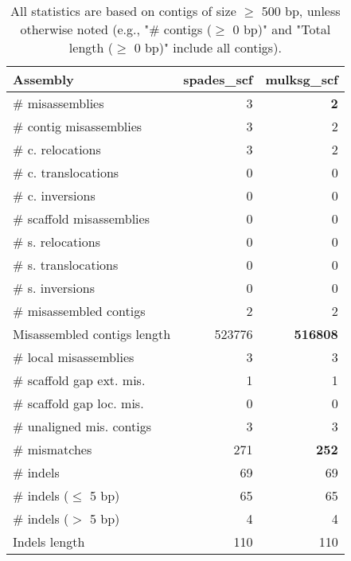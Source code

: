 \documentclass[12pt,a4paper]{article}
\begin{document}
\begin{table}[ht]
\begin{center}
\caption{All statistics are based on contigs of size $\geq$ 500 bp, unless otherwise noted (e.g., "\# contigs ($\geq$ 0 bp)" and "Total length ($\geq$ 0 bp)" include all contigs).}
\begin{tabular}{|l*{2}{|r}|}
\hline
Assembly & spades\_scf & mulksg\_scf \\ \hline
\# misassemblies & 3 & {\bf 2} \\ \hline
\hspace{2mm}\# contig misassemblies & 3 & 2 \\ \hline
\hspace{5mm}\# c. relocations & 3 & 2 \\ \hline
\hspace{5mm}\# c. translocations & 0 & 0 \\ \hline
\hspace{5mm}\# c. inversions & 0 & 0 \\ \hline
\hspace{2mm}\# scaffold misassemblies & 0 & 0 \\ \hline
\hspace{5mm}\# s. relocations & 0 & 0 \\ \hline
\hspace{5mm}\# s. translocations & 0 & 0 \\ \hline
\hspace{5mm}\# s. inversions & 0 & 0 \\ \hline
\# misassembled contigs & 2 & 2 \\ \hline
Misassembled contigs length & 523776 & {\bf 516808} \\ \hline
\# local misassemblies & 3 & 3 \\ \hline
\# scaffold gap ext. mis. & 1 & 1 \\ \hline
\# scaffold gap loc. mis. & 0 & 0 \\ \hline
\# unaligned mis. contigs & 3 & 3 \\ \hline
\# mismatches & 271 & {\bf 252} \\ \hline
\# indels & 69 & 69 \\ \hline
\hspace{5mm}\# indels ($\leq$ 5 bp) & 65 & 65 \\ \hline
\hspace{5mm}\# indels ($>$ 5 bp) & 4 & 4 \\ \hline
Indels length & 110 & 110 \\ \hline
\end{tabular}
\end{center}
\end{table}
\end{document}
